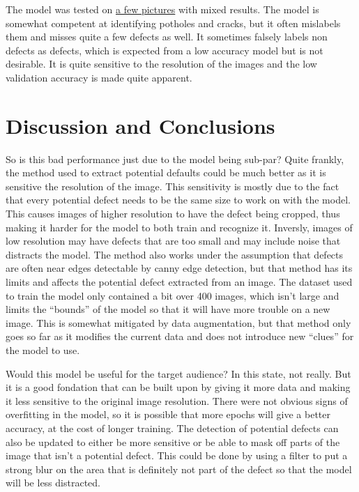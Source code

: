 \documentclass[12pt, letterpaper, twoside]{article}
\begin{document}
The model was tested on \hyperref[app:result_image]{a few pictures} with mixed results. 
The model is somewhat competent at identifying potholes and cracks, but it often mislabels them and misses quite a few defects as well.
It sometimes falsely labels non defects as defects, 
which is expected from a low accuracy model but is not desirable. 
It is quite sensitive to the resolution of the images and the low validation accuracy is made quite apparent.

\section{Discussion and Conclusions}\label{sec:conc}

So is this bad performance just due to the model being sub-par? 
Quite frankly, the method used to extract potential defaults could be much better as it is sensitive the resolution of the image.
This sensitivity is mostly due to the fact that every potential defect needs to be the same size to work on with the model.
This causes images of higher resolution to have the defect being cropped, 
thus making it harder for the model to both train and recognize it.
Inversly, images of low resolution may have defects that are too small and may include noise that distracts the model.
The method also works under the assumption that defects are often near edges detectable by canny edge detection, 
but that method has its limits and affects the potential defect extracted from an image.
The dataset used to train the model only contained a bit over 400 images, 
which isn't large and limits the ``bounds'' of the model so that it will have more trouble on a new image.
This is somewhat mitigated by data augmentation, 
but that method only goes so far as it modifies the current data and does not introduce new ``clues'' for the model to use.

Would this model be useful for the target audience?
In this state, not really.
But it is a good fondation that can be built upon by giving it more data and making it less sensitive to the original image resolution.
There were not obvious signs of overfitting in the model, 
so it is possible that more epochs will give a better accuracy,
at the cost of longer training.
The detection of potential defects can also be updated to either be more sensitive or be able to mask off parts of the image that isn't a potential defect.
This could be done by using a filter to put a strong blur on the area that is definitely not part of the defect so that the model will be less distracted.
\end{document}
